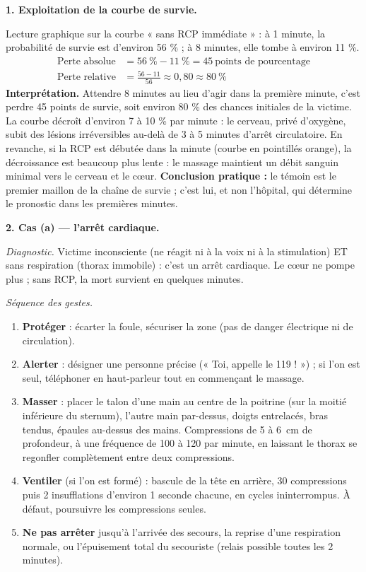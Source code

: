 \documentclass[11pt]{article}
\newcommand{\cle}[1]{{\popxbold\color{popdark}#1}}
\begin{document}
\begin{exoresolu}
\textbf{1. Exploitation de la courbe de survie.}

Lecture graphique sur la courbe « sans RCP immédiate » : à 1 minute, la probabilité de survie est d'environ 56 \% ; à 8 minutes, elle tombe à environ 11 \%.
\begin{align*}
\text{Perte absolue} &= 56\ \% - 11\ \% = 45\ \text{points de pourcentage}\\
\text{Perte relative} &= \frac{56 - 11}{56} \approx 0,80 \approx 80\ \%
\end{align*}
\tcblower
\textbf{Interprétation.} Attendre 8 minutes au lieu d'agir dans la première minute, c'est perdre 45 points de survie, soit environ 80 \% des chances initiales de la victime. La courbe décroît d'environ 7 à 10 \% par minute : le cerveau, privé d'oxygène, subit des lésions irréversibles au-delà de 3 à 5 minutes d'arrêt circulatoire. En revanche, si la RCP est débutée dans la minute (courbe en pointillés orange), la décroissance est beaucoup plus lente : le massage maintient un débit sanguin minimal vers le cerveau et le cœur. \textbf{Conclusion pratique :} le témoin est le premier maillon de la chaîne de survie ; c'est lui, et non l'hôpital, qui détermine le pronostic dans les premières minutes.

\textbf{2. Cas (a) — l'arrêt cardiaque.}

\emph{Diagnostic.} Victime inconsciente (ne réagit ni à la voix ni à la stimulation) ET sans respiration (thorax immobile) : c'est un \cle{arrêt cardiaque}. Le cœur ne pompe plus ; sans RCP, la mort survient en quelques minutes.

\emph{Séquence des gestes.}
\begin{enumerate}
\item \textbf{Protéger} : écarter la foule, sécuriser la zone (pas de danger électrique ni de circulation).
\item \textbf{Alerter} : désigner une personne précise (« Toi, appelle le 119 ! ») ; si l'on est seul, téléphoner en haut-parleur tout en commençant le massage.
\item \textbf{Masser} : placer le talon d'une main au centre de la poitrine (sur la moitié inférieure du sternum), l'autre main par-dessus, doigts entrelacés, bras tendus, épaules au-dessus des mains. Compressions de 5 à \SI{6}{cm} de profondeur, à une fréquence de 100 à 120 par minute, en laissant le thorax se regonfler complètement entre deux compressions.
\item \textbf{Ventiler} (si l'on est formé) : bascule de la tête en arrière, 30 compressions puis 2 insufflations d'environ 1 seconde chacune, en cycles ininterrompus. À défaut, poursuivre les compressions seules.
\item \textbf{Ne pas arrêter} jusqu'à l'arrivée des secours, la reprise d'une respiration normale, ou l'épuisement total du secouriste (relais possible toutes les 2 minutes).
\end{enumerate}


\end{exoresolu}
\end{document}
